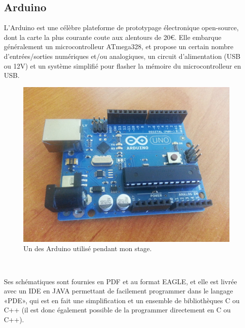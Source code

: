 \documentclass{article}
\begin{document}
\subsection{Arduino}
\label{arduino}

L’Arduino est une célèbre plateforme de prototypage électronique open-source, dont la carte la plus courante coute aux alentours de 20€.
Elle embarque généralement un microcontrolleur ATmega328, et propose un certain nombre d’entrées/sorties numériques et/ou analogiques, un circuit d’alimentation (USB ou 12V) et un système simplifié pour flasher la mémoire du microcontrolleur en USB.


\begin{figure}[h!]
    \centering\includegraphics[width=\linewidth/2]{img/arduino.jpg}
    \caption{Un des Arduino utilisé pendant mon stage.}
\end{figure}

~

Ses schématiques sont fournies en PDF et au format EAGLE, et elle est livrée avec un IDE en JAVA permettant de facilement programmer dans le langage «PDE», qui est en fait une simplification et un ensemble de bibliothèques C ou C++ (il est donc également possible de la programmer directement en C ou C++).
\end{document}

